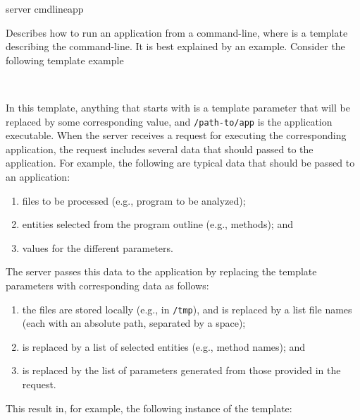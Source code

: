 \noindent
\xmlstruct
{server}
{cmdlineapp}
{%
%
  Describes how to run an application from a command-line, where
   is a template describing the
  command-line. It is best explained by an example. Consider the
  following template example

  \bigskip
  ~~~
  
  \bigskip
  \noindent
  In this template, anything that starts with 
  is a template parameter that will be replaced by some corresponding
  value, and \texttt{/path-to/app} is the application
  executable.
  When the server receives a request for executing the corresponding
  application, the request includes several data that should passed to
  the application. For example, the following are typical data that
  should be passed to an application:
  \begin{enumerate}
  \item files to be processed (e.g., program to be analyzed);
  \item entities selected from the program outline (e.g., methods); and
  \item values for the different parameters.
  \end{enumerate}
  The server passes this data to the application by replacing the
  template parameters with corresponding data as follows:
  \begin{enumerate}
  \item the files are stored locally (e.g., in \texttt{/tmp}), and
     is replaced by a list file names
    (each with an absolute path, separated by a space);
  \item {} is replaced by a list of
    selected entities (e.g., method names); and
  \item {} is replaced by the list of
    parameters generated from those provided in the request.
  \end{enumerate}
  This result in, for example, the following instance of the template:

  \bigskip
  \hspace{0.7cm}

}
